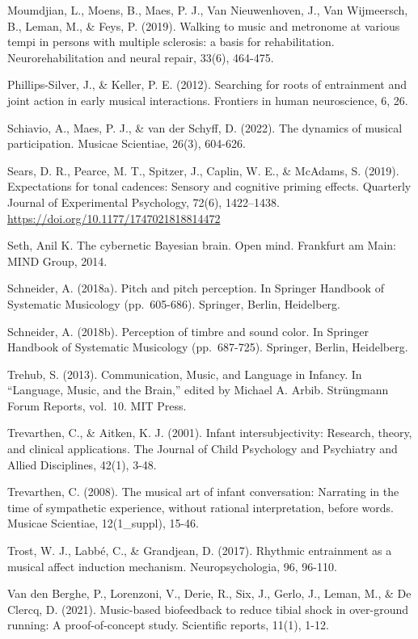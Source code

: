 \documentclass[
]{book}
\theoremstyle{definition}
\theoremstyle{definition}
\theoremstyle{definition}
\theoremstyle{definition}
\theoremstyle{remark}
\begin{document}
Moumdjian, L., Moens, B., Maes, P. J., Van Nieuwenhoven, J., Van Wijmeersch, B., Leman, M., \& Feys, P. (2019). Walking to music and metronome at various tempi in persons with multiple sclerosis: a basis for rehabilitation. Neurorehabilitation and neural repair, 33(6), 464-475.

Phillips-Silver, J., \& Keller, P. E. (2012). Searching for roots of entrainment and joint action in early musical interactions. Frontiers in human neuroscience, 6, 26.

Schiavio, A., Maes, P. J., \& van der Schyff, D. (2022). The dynamics of musical participation. Musicae Scientiae, 26(3), 604-626.

Sears, D. R., Pearce, M. T., Spitzer, J., Caplin, W. E., \& McAdams, S. (2019). Expectations for tonal cadences: Sensory and cognitive priming effects. Quarterly Journal of Experimental Psychology, 72(6), 1422--1438. \url{https://doi.org/10.1177/1747021818814472}

Seth, Anil K. The cybernetic Bayesian brain. Open mind. Frankfurt am Main: MIND Group, 2014.

Schneider, A. (2018a). Pitch and pitch perception. In Springer Handbook of Systematic Musicology (pp.~605-686). Springer, Berlin, Heidelberg.

Schneider, A. (2018b). Perception of timbre and sound color. In Springer Handbook of Systematic Musicology (pp.~687-725). Springer, Berlin, Heidelberg.

Trehub, S. (2013). Communication, Music, and Language in Infancy. In ``Language, Music, and the Brain,'' edited by Michael A. Arbib. Strüngmann Forum Reports, vol.~10. MIT Press.

Trevarthen, C., \& Aitken, K. J. (2001). Infant intersubjectivity: Research, theory, and clinical applications. The Journal of Child Psychology and Psychiatry and Allied Disciplines, 42(1), 3-48.

Trevarthen, C. (2008). The musical art of infant conversation: Narrating in the time of sympathetic experience, without rational interpretation, before words. Musicae Scientiae, 12(1\_suppl), 15-46.

Trost, W. J., Labbé, C., \& Grandjean, D. (2017). Rhythmic entrainment as a musical affect induction mechanism. Neuropsychologia, 96, 96-110.

Van den Berghe, P., Lorenzoni, V., Derie, R., Six, J., Gerlo, J., Leman, M., \& De Clercq, D. (2021). Music-based biofeedback to reduce tibial shock in over-ground running: A proof-of-concept study. Scientific reports, 11(1), 1-12.
\end{document}
